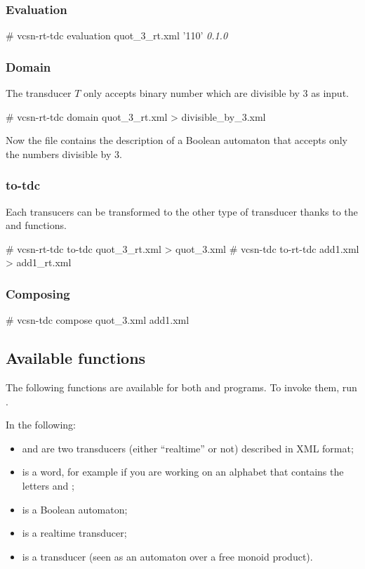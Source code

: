 \subsubsection{Evaluation}
\begin{shell}
# vcsn-rt-tdc evaluation quot_3_rt.xml '110'
\textit{0.1.0}
\end{shell}

\subsubsection{Domain}
The transducer $T$ only accepts binary number which are divisible by 3
as input.
\begin{shell}
# vcsn-rt-tdc domain quot_3_rt.xml > divisible_by_3.xml
\end{shell}
Now the file  contains the description of a
Boolean automaton that accepts only the numbers divisible by 3.

\subsubsection{to-tdc}
Each transucers can be transformed to the other type of transducer
thanks to the  and  functions.
\begin{shell}
# vcsn-rt-tdc to-tdc quot_3_rt.xml > quot_3.xml
# vcsn-tdc to-rt-tdc add1.xml > add1_rt.xml
\end{shell}

\subsubsection{Composing}
\begin{shell}
# vcsn-tdc compose quot_3.xml add1.xml
\end{shell}

\subsection{Available functions}
The following functions are available for both 
and  programs.  To invoke them, run
.

\smallskip

In the following:

\begin{itemize}
\item {} and  are two transducers (either
  ``realtime'' or not) described in \Vauc XML format;
\item {} is a word, for example  if you are
  working on an alphabet that contains the letters  and
  ;
\item {} is a Boolean automaton;
\item {} is a realtime transducer;
\item {} is a transducer (seen as an automaton over a
  free monoid product).
\end{itemize}

